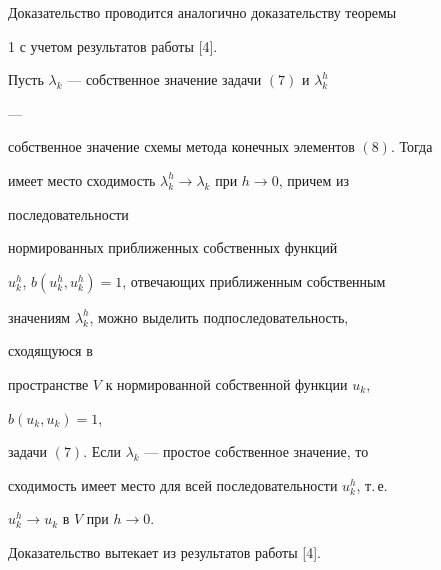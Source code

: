  


Доказательство проводится аналогично доказательству теоремы 


1 с учетом результатов работы [4]. 


 


\begin{thm} 


Пусть $\lambda_k$ --- собственное значение задачи $(7)$ и $\lambda^h_k$ 


--- 


собственное значение схемы метода конечных элементов $(8)$. Тогда  


имеет место сходимость $\lambda^h_k\to\lambda_k$ при $h\to0$, причем из 


последовательности  


нормированных приближенных собственных функций  


$u^h_k$, $b(u^h_k,u^h_k)=1$, отвечающих приближенным собственным  


значениям $\lambda^h_k$, можно выделить подпоследовательность, 


сходящуюся в  


пространстве $V$ к нормированной собственной функции $u_k$, 


$b(u_k,u_k)=1$, 


задачи $(7)$. Если $\lambda_k$ --- простое собственное значение, то  


сходимость имеет место для всей последовательности $u^h_k$, т.\,е. 


$u^h_k\to u_k$ в $V$ при $h\to0$. 


\end{thm} 


 


Доказательство вытекает из результатов работы [4]. 


 


